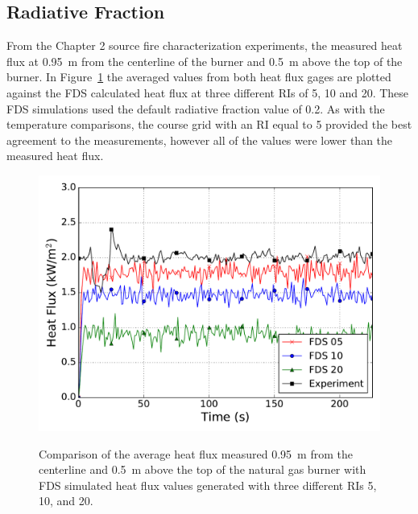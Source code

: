 \documentclass[twoside]{uocthesis}
\begin{document}
{\subsection{Radiative Fraction}

From the Chapter 2 source fire characterization experiments, the measured heat flux at 0.95~m from the centerline of the burner and 0.5~m above the top of the burner. 
In Figure~\ref{FHNG01_HF_RI} the averaged values from both heat flux gages are plotted against the FDS calculated heat flux at three different RIs of 5, 10 and 20.  These FDS simulations used the default radiative fraction value of 0.2.  As with the temperature comparisons, the course grid with an RI equal to 5 provided the best agreement to the measurements, however all of the values were lower than the measured heat flux.  

\begin{figure}
	\includegraphics[width=5in]{../Figures/FHNG01_HF_RI} \\
	\caption[Comparison of the average heat flux measured 0.95~m from the centerline and 0.5~m above the top of the natural gas burner with FDS simulated heat flux values.]{Comparison of the average heat flux measured 0.95~m from the centerline and 0.5~m above the top of the natural gas burner with FDS simulated heat flux values generated with three different RIs 5, 10, and 20.}
	\label{FHNG01_HF_RI}
\end{figure}

}
\end{document}
